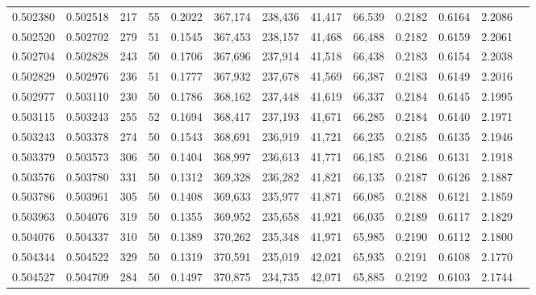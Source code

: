 \begin{tabular}{rrrrrrrrrrrrr}
0.502380 & 0.502518 &   217 &  55 &                                     0.2022 & 367,174 & 238,436 &  41,417 &  66,539 & 0.2182 & 0.6164 & 2.2086 \\
0.502520 & 0.502702 &   279 &  51 &                                     0.1545 & 367,453 & 238,157 &  41,468 &  66,488 & 0.2182 & 0.6159 & 2.2061 \\
0.502704 & 0.502828 &   243 &  50 &                                     0.1706 & 367,696 & 237,914 &  41,518 &  66,438 & 0.2183 & 0.6154 & 2.2038 \\
0.502829 & 0.502976 &   236 &  51 &                                     0.1777 & 367,932 & 237,678 &  41,569 &  66,387 & 0.2183 & 0.6149 & 2.2016 \\
0.502977 & 0.503110 &   230 &  50 &                                     0.1786 & 368,162 & 237,448 &  41,619 &  66,337 & 0.2184 & 0.6145 & 2.1995 \\
0.503115 & 0.503243 &   255 &  52 &                                     0.1694 & 368,417 & 237,193 &  41,671 &  66,285 & 0.2184 & 0.6140 & 2.1971 \\
0.503243 & 0.503378 &   274 &  50 &                                     0.1543 & 368,691 & 236,919 &  41,721 &  66,235 & 0.2185 & 0.6135 & 2.1946 \\
0.503379 & 0.503573 &   306 &  50 &                                     0.1404 & 368,997 & 236,613 &  41,771 &  66,185 & 0.2186 & 0.6131 & 2.1918 \\
0.503576 & 0.503780 &   331 &  50 &                                     0.1312 & 369,328 & 236,282 &  41,821 &  66,135 & 0.2187 & 0.6126 & 2.1887 \\
0.503786 & 0.503961 &   305 &  50 &                                     0.1408 & 369,633 & 235,977 &  41,871 &  66,085 & 0.2188 & 0.6121 & 2.1859 \\
0.503963 & 0.504076 &   319 &  50 &                                     0.1355 & 369,952 & 235,658 &  41,921 &  66,035 & 0.2189 & 0.6117 & 2.1829 \\
0.504076 & 0.504337 &   310 &  50 &                                     0.1389 & 370,262 & 235,348 &  41,971 &  65,985 & 0.2190 & 0.6112 & 2.1800 \\
0.504344 & 0.504522 &   329 &  50 &                                     0.1319 & 370,591 & 235,019 &  42,021 &  65,935 & 0.2191 & 0.6108 & 2.1770 \\
0.504527 & 0.504709 &   284 &  50 &                                     0.1497 & 370,875 & 234,735 &  42,071 &  65,885 & 0.2192 & 0.6103 & 2.1744 \\

\end{tabular}
